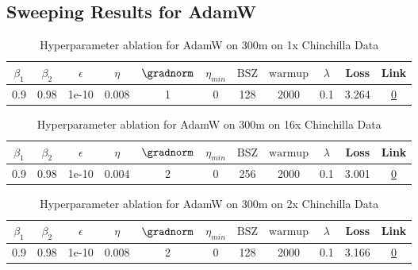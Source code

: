 \subsection{Sweeping Results for AdamW}%
\begin{table}[H]
\centering
\caption{Hyperparameter ablation for AdamW on 300m on 1x Chinchilla Data}
\label{tab:ablation_adamw_300m_1}
\begin{tabular}{ccccccccccc}
\toprule
$\beta_1$ & $\beta_2$ & $\epsilon$ & $\eta$ & $\gradnorm$ & $\eta_{min}$ & $\mathrm{BSZ}$ & $\mathrm{warmup}$ & $\lambda$ & Loss & Link \\
\midrule
0.9 & 0.98 & 1e-10 & 0.008 & 1 & 0 & 128 & 2000 & 0.1 & 3.264 & \href{https://wandb.ai/stanford-mercury/optimizer-scaling/runs/sweep-300m-6B-adamwa7aafelr0.008-wd0.1-minlr0-warmup2000-b10.9-b-990eda}{0} \\
\midrule
\bottomrule
\end{tabular}
\end{table}

\begin{table}[H]
\centering
\caption{Hyperparameter ablation for AdamW on 300m on 16x Chinchilla Data}
\label{tab:ablation_adamw_300m_16}
\begin{tabular}{ccccccccccc}
\toprule
$\beta_1$ & $\beta_2$ & $\epsilon$ & $\eta$ & $\gradnorm$ & $\eta_{min}$ & $\mathrm{BSZ}$ & $\mathrm{warmup}$ & $\lambda$ & Loss & Link \\
\midrule
0.9 & 0.98 & 1e-10 & 0.004 & 2 & 0 & 256 & 2000 & 0.1 & 3.001 & \href{https://wandb.ai/stanford-mercury/optimizer-scaling/runs/sweep-300m-96B-adamwfcee97lr0.004-wd0.1-minlr0-warmup2000-b10.9--18b705}{0} \\
\midrule
\bottomrule
\end{tabular}
\end{table}

\begin{table}[H]
\centering
\caption{Hyperparameter ablation for AdamW on 300m on 2x Chinchilla Data}
\label{tab:ablation_adamw_300m_2}
\begin{tabular}{ccccccccccc}
\toprule
$\beta_1$ & $\beta_2$ & $\epsilon$ & $\eta$ & $\gradnorm$ & $\eta_{min}$ & $\mathrm{BSZ}$ & $\mathrm{warmup}$ & $\lambda$ & Loss & Link \\
\midrule
0.9 & 0.98 & 1e-10 & 0.008 & 2 & 0 & 128 & 2000 & 0.1 & 3.166 & \href{https://wandb.ai/stanford-mercury/optimizer-scaling/runs/sweep-300m-12B-adamwo5dcabdlr0.008-wd0.1-minlr0-warmup2000-b10.9-3d4fae}{0} \\
\midrule
\bottomrule
\end{tabular}
\end{table}


